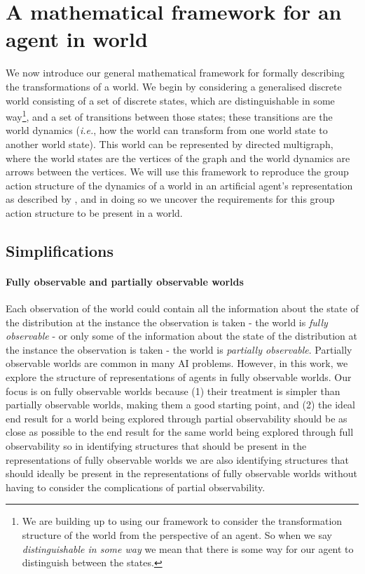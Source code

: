 \section{A mathematical framework for an agent in world}\label{sec:Mathematical framework for an agent in an environment}




We now introduce our general mathematical framework for formally describing the transformations of a world.
We begin by considering a generalised discrete world consisting of a set of
discrete states, which are distinguishable in some way\footnote{We are building up to using our framework to consider the transformation structure of the world from the perspective of an agent. So when we say \emph{distinguishable in some way} we mean that there is some way for our agent to distinguish between the states.}, and a set of transitions between those states; these transitions are the world dynamics (\textit{i.e.}, how the world can transform from one world state to another world state).
This world can be represented by directed multigraph, where the world states are the vertices of the graph and the world dynamics are arrows between the
vertices.
We will use this framework to reproduce the group action structure of the dynamics of a world in an artificial agent’s representation as described by \cite{Higgins2018}, and in doing so we uncover the requirements for this group action structure to be present in a world.

\subsection{Simplifications}\label{sec:Simplifications}

\paragraph{Fully observable and partially observable worlds}
Each observation of the world could contain all the information about the state of the distribution at the instance the observation is taken - the world is \textit{fully observable} - or only some of the information about the state of the distribution at the instance the observation is taken - the world is \textit{partially observable}.
Partially observable worlds are common in many AI problems.
However, in this work, we explore the structure of representations of agents in fully observable worlds.
Our focus is on fully observable worlds because (1) their treatment is simpler than partially observable worlds, making them a good starting point, and (2) the ideal end result for a world being explored through partial observability should be as close as possible to the end result for the same world being explored through full observability so in identifying structures that should be present in the representations of fully observable worlds we are also identifying structures that should ideally be present in the representations of fully observable worlds without having to consider the complications of partial observability.

